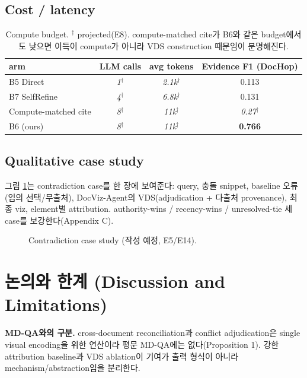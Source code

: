 \documentclass[11pt]{article}
\newcommand{\proj}[1]{\textit{#1}$^\dagger$}
\begin{document}
\subsection{Cost / latency}
\label{sec:cost}
\begin{table}[h]
\centering\small
\begin{tabular}{lccc}
\toprule
arm & LLM calls & avg tokens & Evidence F1 (DocHop) \\
\midrule
B5 Direct & \proj{1} & \proj{2.1k} & 0.113 \\
B7 SelfRefine & \proj{4} & \proj{6.8k} & 0.131 \\
Compute-matched cite & \proj{8} & \proj{11k} & \proj{0.27} \\
B6 (ours) & \proj{8} & \proj{11k} & \textbf{0.766} \\
\bottomrule
\end{tabular}
\caption{Compute budget. $^\dagger$ projected(E8). compute-matched cite가 B6와 같은 budget에서도
낮으면 이득이 compute가 아니라 VDS construction 때문임이 분명해진다.}
\label{tab:cost}
\end{table}

\subsection{Qualitative case study}
\label{sec:case}
그림 \ref{fig:case}는 contradiction case를 한 장에 보여준다: query, 충돌 snippet, baseline 오류
(임의 선택/무출처), DocViz-Agent의 VDS(adjudication + 다출처 provenance), 최종 viz, element별
attribution. authority-wins / recency-wins / unresolved-tie 세 case를 보강한다(Appendix C).

\begin{figure}[h]
\centering
{}
\caption{Contradiction case study (작성 예정, E5/E14).}
\label{fig:case}
\end{figure}

\section{논의와 한계 (Discussion and Limitations)}
\textbf{MD-QA와의 구분.} cross-document reconciliation과 conflict adjudication은 single visual
encoding을 위한 연산이라 평문 MD-QA에는 없다(Proposition 1). 강한 attribution baseline과 VDS
ablation이 기여가 출력 형식이 아니라 mechanism/abstraction임을 분리한다.
\end{document}
